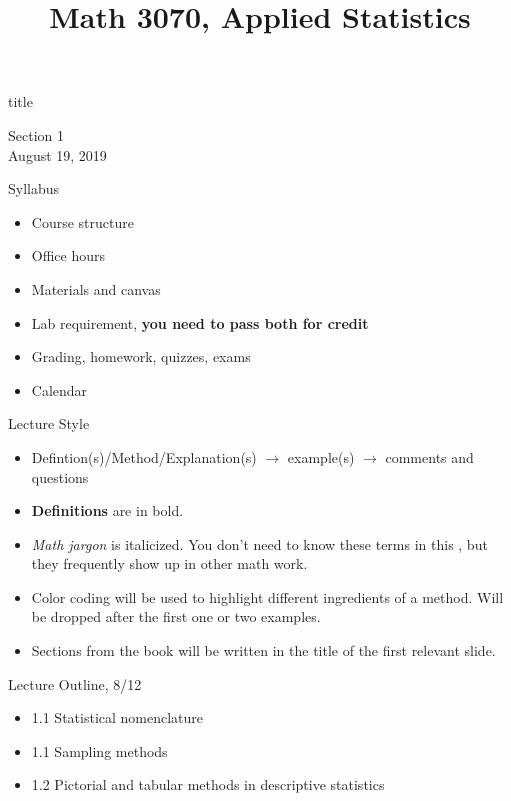 \documentclass{beamer}
\title{Math 3070, Applied Statistics}
\newcommand{\blue}[1]{{\color{blue} #1}}
\newcommand{\red}[1]{{\color{red} #1}}
\newcommand{\nl}[1]{\vspace{#1 em}}
\begin{document}
\begin{frame}
    \begin{beamercolorbox}[rounded=true,wd=\textwidth,center]{title}
        \inserttitle
    \end{beamercolorbox}
    \begin{center}
        Section 1\\
        \nl{0.5}
        August 19, 2019
    \end{center}

\end{frame}

\begin{frame}{Syllabus}
    \begin{itemize}
        \item Course structure
        \item Office hours
        \item Materials and canvas
        \item Lab requirement, {\bf you need to pass both for credit}
        \item Grading, homework, quizzes, exams
        \item Calendar
    \end{itemize}
\end{frame}

\begin{frame}{Lecture Style}
    \begin{itemize}
        \item Defintion(s)/Method/Explanation(s) $\rightarrow$ example(s) $\rightarrow$ comments and questions
        \item {\bf Definitions} are in bold.
        \item {\it Math jargon} is italicized. You don't need to know these terms in this , but they frequently show up in other math work.
        \item \blue{Color} \red{coding} will be used to highlight different ingredients of a method. Will be dropped after the first one or two examples.
        \item Sections from the book will be written in the title of the first relevant slide.
    \end{itemize}
\end{frame}

\begin{frame}{Lecture Outline, 8/12}
    \begin{itemize}
        \item 1.1 Statistical nomenclature
        \item 1.1 Sampling methods
        \item 1.2 Pictorial and tabular methods in descriptive statistics
    \end{itemize}
\end{frame}
\end{document}
